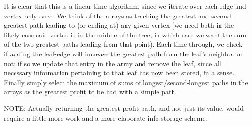 \documentclass{article}
\begin{document}
    It is clear that this is a linear time algorithm, since we iterate over each edge and vertex only once. We think of the arrays as tracking the greatest and second-greatest path leading to (or ending at) any given vertex (we need both in the likely case said vertex is in the middle of the tree, in which case we want the sum of the two greatest paths leading from that point). Each time through, we check if adding the leaf-edge will increase the greatest path from the leaf's neighbor or not; if so we update that entry in the array and remove the leaf, since all necessary information pertaining to that leaf has now been stored, in a sense. Finally simply select the maximum of sums of longest/second-longest paths in the arrays as the greatest profit to be had with a simple path. 
    
    NOTE: Actually returning the greatest-profit path, and not just its value, would require a little more work and a more elaborate info storage scheme.
    
\end{document}
